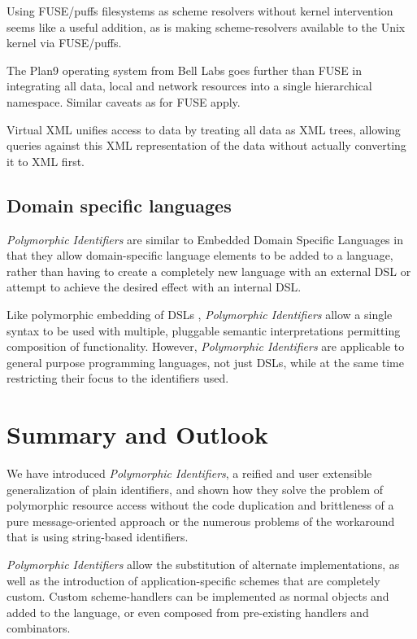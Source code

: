 \documentclass[preprint,authoryear]{llncs}
\begin{document}
Using FUSE/puffs filesystems as scheme resolvers without kernel intervention seems
like a useful addition, as is making scheme-resolvers available to the Unix kernel
via FUSE/puffs.

The Plan9\cite{plan9names}\cite{plan9network} operating system from Bell Labs goes further than FUSE in integrating
all data, local and network resources into a single hierarchical namespace.  Similar
caveats as for FUSE apply.

Virtual XML\cite{Rose:2006:VXT:1150706.1150719} unifies access to data by treating all data as
XML trees, allowing queries against this XML representation of the data without
actually converting it to XML first.  


\subsection{Domain specific languages}

\emph{Polymorphic Identifiers} are similar to Embedded Domain Specific Languages\cite{edsl}
in that they allow domain-specific language elements to be added to a language, rather
than having to create a completely new language with an external DSL or attempt to 
achieve the desired effect with an internal DSL\cite{fowlerdsl}.  

Like polymorphic embedding of DSLs \cite{polydsl}, \emph{Polymorphic Identifiers} allow
a single syntax to be used with multiple, pluggable semantic interpretations permitting
composition of functionality\cite{embeddeddsl}.  However, \emph{Polymorphic Identifiers}
are applicable to general purpose programming languages, not just DSLs, while
at the same time restricting their focus to the identifiers used.



\section{Summary and Outlook}
\label{summary-and-outlook}

We have introduced \emph{Polymorphic Identifiers}, a reified and user extensible 
generalization of plain identifiers, and shown how they
solve the problem of polymorphic resource access without
the code duplication and brittleness of a pure message-oriented approach or the
numerous problems of the workaround that is using string-based identifiers.

\emph{Polymorphic Identifiers} allow the substitution of alternate implementations,
as well as the introduction of 
application-specific schemes that are completely custom.
Custom scheme-handlers can be implemented as normal objects and added
to the language, or even composed from pre-existing handlers and
combinators.
\end{document}
